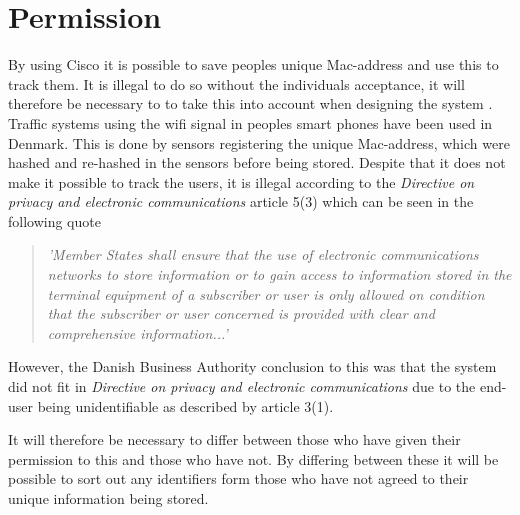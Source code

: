 \section{Permission}
By using Cisco it is possible to save peoples unique Mac-address and use this to track them. It is illegal to do so without the individuals acceptance, it will therefore be necessary to to take this into account when designing the system \cite{TrafficIlligal}.
Traffic systems using the wifi signal in peoples smart phones have been used in Denmark. This is done by sensors registering the unique Mac-address, which were hashed and re-hashed in the sensors before being stored. Despite that it does not make it possible to track the users\cite{TrafficIligal}, it is illegal according to the \textit{Directive on privacy and electronic communications} article 5(3)\cite{CookieDirective} which can be seen in the following quote

\begin{quote}
\textit{'Member States shall ensure that the use of electronic communications networks to store information or to gain access to information stored in the terminal equipment of a subscriber or user is only allowed on condition that the subscriber or user concerned is provided with clear and comprehensive information...'}
\end{quote}

However, the Danish Business Authority conclusion to this was that the system did not fit in \textit{Directive on privacy and electronic communications} due to the end-user being unidentifiable\cite{TrafficOK} as described by article 3(1)\cite{CookieDirective}.


It will therefore be necessary to differ between those who have given their permission to this and those who have not. By differing between these it will be possible to sort out any identifiers form those who have not agreed to their unique information being stored.

